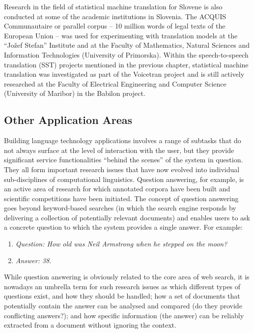 \begin{multicols}{2}

Research in the field of statistical machine translation for Slovene is also conducted at some of the academic institutions in Slovenia. The ACQUIS Communautaire \cite{ET1} or parallel corpus – 10 million words of legal texts of the European Union – was used for experimenting with translation models at the “Jožef Stefan” Institute and at the Faculty of Mathematics, Natural Sciences and Information Technologies (University of Primorska). Within the speech-to-speech translation (SST) projects mentioned in the previous chapter, statistical machine translation was investigated as part of the Voicetran project and is still actively researched at the Faculty of Electrical Engineering and Computer Science (University of Maribor) in the Babilon project. 

\subsection{Other Application Areas}

Building language technology applications involves a range of subtasks that do not always surface at the level of interaction with the user, but they provide significant service functionalities “behind the scenes” of the system in question. They all form important research issues that have now evolved into individual sub-disciplines of computational linguistics.  Question answering, for example, is an active area of research for which annotated corpora have been built and scientific competitions have been initiated. The concept of question answering goes beyond keyword-based searches (in which the search engine responds by delivering a collection of potentially relevant documents) and enables users to ask a concrete question to which the system provides a single answer. For example:

\begin{enumerate}
\item[]\textit{Question: How old was Neil Armstrong when he stepped on the moon?}
\item[]\textit{Answer: 38.}
\end{enumerate}

While question answering is obviously related to the core area of web search, it is nowadays an umbrella term for such research issues as which different types of questions exist, and how they should be handled; how a set of documents that potentially contain the answer can be analysed and compared (do they provide conflicting answers?); and how specific information (the answer) can be reliably extracted from a document without ignoring the context. 


\end{multicols}
